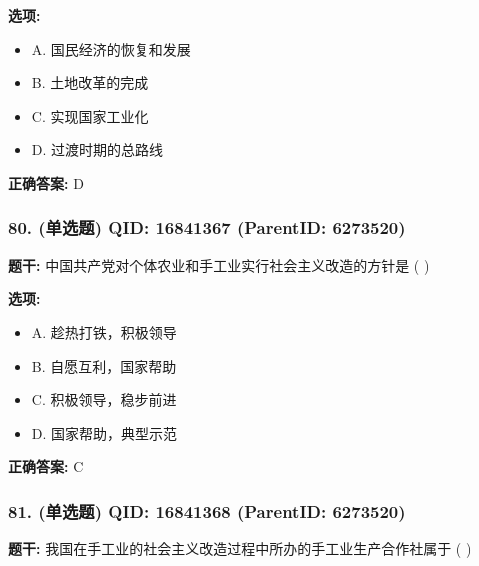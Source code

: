 \documentclass[12pt,UTF8]{ctexart}
\begin{document}
\textbf{选项:}
\begin{itemize}[leftmargin=*]

  \item A. 国民经济的恢复和发展

  \item B. 土地改革的完成

  \item C. 实现国家工业化

  \item D. 过渡时期的总路线

\end{itemize}

\textbf{正确答案:}
D

\vspace{0.3em}\hrulefill\vspace{0.7em}

\subsubsection*{80. (单选题) \small QID: 16841367 (ParentID: 6273520)}

\textbf{题干:}
中国共产党对个体农业和手工业实行社会主义改造的方针是 ( )



\textbf{选项:}
\begin{itemize}[leftmargin=*]

  \item A. 趁热打铁，积极领导

  \item B. 自愿互利，国家帮助

  \item C. 积极领导，稳步前进

  \item D. 国家帮助，典型示范

\end{itemize}

\textbf{正确答案:}
C

\vspace{0.3em}\hrulefill\vspace{0.7em}

\subsubsection*{81. (单选题) \small QID: 16841368 (ParentID: 6273520)}

\textbf{题干:}
我国在手工业的社会主义改造过程中所办的手工业生产合作社属于 ( )
\end{document}
